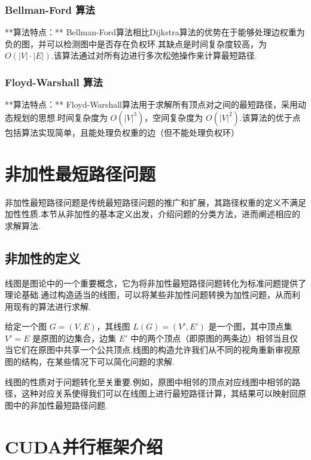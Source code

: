 \subsubsection{Bellman-Ford 算法}

**算法特点：** Bellman-Ford算法相比Dijkstra算法的优势在于能够处理边权重为负的图，并可以检测图中是否存在负权环.其缺点是时间复杂度较高，为 $O(|V| \cdot |E|)$.该算法通过对所有边进行多次松弛操作来计算最短路径.

\subsubsection{Floyd-Warshall 算法}

**算法特点：** Floyd-Warshall算法用于求解所有顶点对之间的最短路径，采用动态规划的思想.时间复杂度为 $O(|V|^3)$，空间复杂度为 $O(|V|^2)$.该算法的优于点包括算法实现简单，且能处理负权重的边（但不能处理负权环）



\section{非加性最短路径问题}

非加性最短路径问题是传统最短路径问题的推广和扩展，其路径权重的定义不满足加性性质.本节从非加性的基本定义出发，介绍问题的分类方法，进而阐述相应的求解算法.

\subsection{非加性的定义}

线图是图论中的一个重要概念，它为将非加性最短路径问题转化为标准问题提供了理论基础.通过构造适当的线图，可以将某些非加性问题转换为加性问题，从而利用现有的算法进行求解.

给定一个图 \( G = (V, E) \)，其线图 \( L(G) = (V', E') \) 是一个图，其中顶点集 \( V' = E \) 是原图的边集合，边集 \( E' \) 中的两个顶点（即原图的两条边）相邻当且仅当它们在原图中共享一个公共顶点.线图的构造允许我们从不同的视角重新审视原图的结构，在某些情况下可以简化问题的求解.

线图的性质对于问题转化至关重要.例如，原图中相邻的顶点对应线图中相邻的路径，这种对应关系使得我们可以在线图上进行最短路径计算，其结果可以映射回原图中的非加性最短路径问题.

\section{CUDA并行框架介绍}

